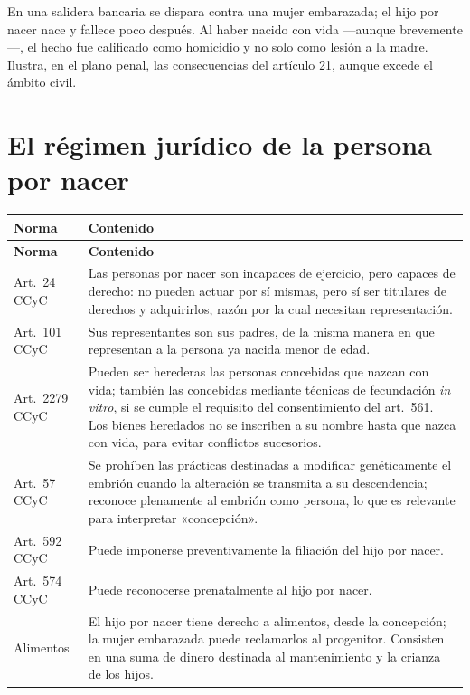 \documentclass[12pt,oneside]{book}
\begin{document}
\begin{ejemplo}
En una salidera bancaria se dispara contra una mujer embarazada; el hijo por nacer nace y fallece poco después. Al haber nacido con vida ---aunque brevemente---, el hecho fue calificado como homicidio y no solo como lesión a la madre. Ilustra, en el plano penal, las consecuencias del artículo 21, aunque excede el ámbito civil.
\end{ejemplo}

\section{El régimen jurídico de la persona por nacer}

\begin{longtable}{@{}B{0.20\textwidth}L{0.70\textwidth}@{}}
\toprule
\textbf{Norma} & \textbf{Contenido} \\
\midrule
\endfirsthead
\toprule
\textbf{Norma} & \textbf{Contenido} \\
\midrule
\endhead
\bottomrule
\endfoot
Art.~24 CCyC & Las personas por nacer son incapaces de ejercicio, pero capaces de derecho: no pueden actuar por sí mismas, pero sí ser titulares de derechos y adquirirlos, razón por la cual necesitan representación. \\
Art.~101 CCyC & Sus representantes son sus padres, de la misma manera en que representan a la persona ya nacida menor de edad. \\
Art.~2279 CCyC & Pueden ser herederas las personas concebidas que nazcan con vida; también las concebidas mediante técnicas de fecundación \textit{in vitro}, si se cumple el requisito del consentimiento del art.~561. Los bienes heredados no se inscriben a su nombre hasta que nazca con vida, para evitar conflictos sucesorios. \\
Art.~57 CCyC & Se prohíben las prácticas destinadas a modificar genéticamente el embrión cuando la alteración se transmita a su descendencia; reconoce plenamente al embrión como persona, lo que es relevante para interpretar «concepción». \\
Art.~592 CCyC & Puede imponerse preventivamente la filiación del hijo por nacer. \\
Art.~574 CCyC & Puede reconocerse prenatalmente al hijo por nacer. \\
Alimentos & El hijo por nacer tiene derecho a alimentos, desde la concepción; la mujer embarazada puede reclamarlos al progenitor. Consisten en una suma de dinero destinada al mantenimiento y la crianza de los hijos. \\
\end{longtable}
\end{document}
